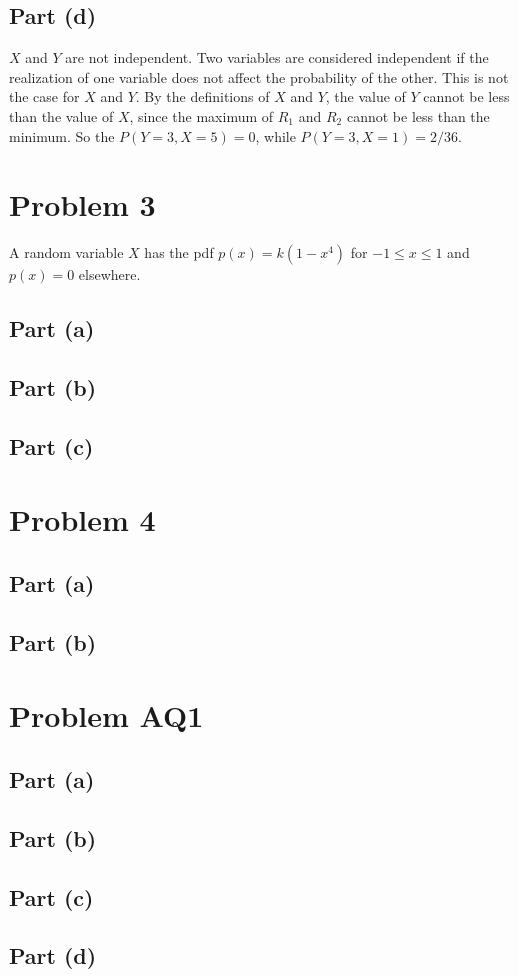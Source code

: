 \documentclass[11pt]{article}
\begin{document}
\subsection*{Part (d)}
$X$ and $Y$ are not independent. Two variables are considered independent if the realization of one variable does not affect the probability of the other. This is not the case for $X$ and $Y$. By the definitions of $X$ and $Y$, the value of $Y$ cannot be less than the value of $X$, since the maximum of $R_1$ and $R_2$ cannot be less than the minimum. So the $P(Y=3,X=5)=0$, while $P(Y=3,X=1) = 2/36$.

\section*{Problem 3}
A random variable $X$ has the pdf $p(x)=k(1-x^4)$ for $-1\leq x\leq1$ and $p(x)=0$ elsewhere.

\subsection*{Part (a)}
\subsection*{Part (b)}
\subsection*{Part (c)}
\section*{Problem 4}
\subsection*{Part (a)}
\subsection*{Part (b)}
\section*{Problem AQ1}
\subsection*{Part (a)}
\subsection*{Part (b)}
\subsection*{Part (c)}
\subsection*{Part (d)}
\end{document}
